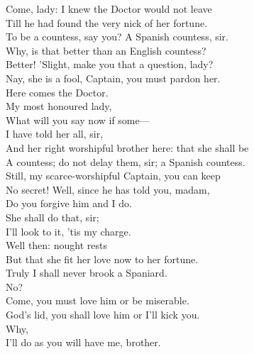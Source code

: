 \documentclass[a4paper,oneside,12pt]{memoir}
\begin{document}
\begin{drama*}
\facespeaks Come, lady: I knew the Doctor would not leave\\
Till he had found the very nick of her fortune.\\
\kastrilspeaks To be a countess, say you?
\facespeaks {} A Spanish countess, sir.\\
\pliantspeaks Why, is that better than an English countess?\\
\facespeaks Better! 'Slight, make you that a question, lady?\\
\kastrilspeaks Nay, she is a fool, Captain, you must pardon her.\\
\facespeaks Here comes the Doctor.\\
\subtlespeaks {} My most honoured lady,\\
What will you say now if some---\\
\facespeaks {} I have told her all, sir,\\
And her right worshipful brother here: that she shall be\\
A countess; do not delay them, sir; a Spanish countess.\\
\subtlespeaks Still, my scarce-worshipful Captain, you can keep\\
No secret! Well, since he has told you, madam,\\
Do you forgive him and I do.\\
\kastrilspeaks {} She shall do that, sir;\\
I'll look to it, 'tis my charge.\\
\subtlespeaks {} Well then: nought rests\\
But that she fit her love now to her fortune.\\
\pliantspeaks Truly I shall never brook a Spaniard.\\
\subtlespeaks {} No?\\
Come, you must love him or be miserable.\\
\kastrilspeaks God's lid, you shall love him or I'll kick you.\\
\pliantspeaks {} Why,\\
I'll do as you will have me, brother.\\

\end{drama*}
\end{document}
